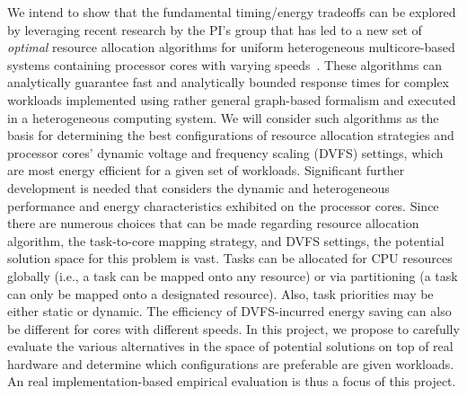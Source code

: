 We intend to show that the fundamental timing/energy tradeoffs can be explored by leveraging recent research by the PI's group that has led to a new set of \textit{optimal} resource allocation algorithms for uniform heterogeneous multicore-based systems containing processor cores with varying speeds~\cite{Zhou2014a, Liu1, Liu2, Liu6, Liu7}. These algorithms can analytically guarantee fast and analytically bounded response times for complex workloads implemented using rather general graph-based formalism and executed in a heterogeneous computing system.  %
We will consider such algorithms as the basis for determining the best configurations of resource allocation  strategies and processor cores' dynamic voltage and frequency scaling (DVFS) settings, which are most energy efficient for a given set of workloads. Significant further development is needed that considers the dynamic and heterogeneous performance and energy characteristics exhibited on the processor cores.
 Since there are numerous choices that can be made regarding resource allocation algorithm,  the task-to-core mapping strategy, and DVFS settings, the potential solution space for this problem is vast. Tasks can be allocated for CPU resources globally (i.e., a task can be mapped onto any resource) or via partitioning (a task can only be mapped onto a designated resource). Also, task priorities may be either static or dynamic. %
 The efficiency of DVFS-incurred energy saving can also be different for cores with different speeds. 
 In this project, we propose to carefully evaluate the various alternatives in the space of potential solutions on top of real hardware and determine which configurations are preferable are given workloads. An real implementation-based empirical evaluation is thus a focus of this project.

\vspace{-2mm}
